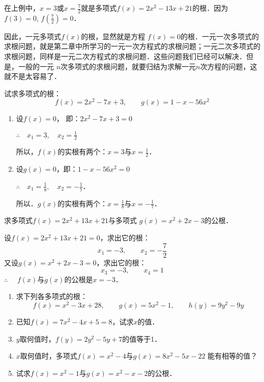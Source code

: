 在上例中，$x=3$或$x=\frac{7}{2}$就是多项式$f(x)=2x^2-13x+21$的根．因为$f(3)=0$, $f\left(\frac{7}{2}\right) =0$．

因此，一元多项式$f(x)$的根，显然就是方程
$f(x)=0$的根．一元一次多项式的求根问题，就是第二章中所学习的一元一次方程式的求根问题；一元二次多项式的求根问题，同样是一元二次方程式的求根问题．这些问题我们已经可以解决．但是，一般的一元
$n$次多项式的求根问题，就要归结为求解一元$n$次方程的问题，这就不是太容易了．

\begin{example}
    试求多项式的根：
\[f (x) =2x^2-7x+3,\qquad g (x) =1-x-56x^2\]
\end{example}

\begin{solution}
  \begin{enumerate}
      \item 设$f(x)=0$，
      即：$2x^2-7x+3=0$

      $\therefore\quad x_1=3,\quad x_2=\frac{1}{2}$

      所以，$f(x)$的实根有两个：$x=3$与$x=\frac{1}{2}$．
      \item 设$g(x)=0$，即：$1-x-56x^2=0$
      
$\therefore\quad x_1=\frac{1}{8},\quad x_2=-\frac{1}{7}$．

所以．$g(x)$的实根有两个：$x=\frac{1}{8}$与$x=-\frac{1}{7}$．
  \end{enumerate}  
\end{solution}

\begin{example}
    求多项式$f(x)=2x^2+13x+21$与多项式
$g(x)=x^2+2x-3$的公根．
\end{example}

\begin{solution}
    设$f(x)=2x^2+13x+21=0$，求出它的根：
\[x_1=-3,\qquad x_2=-\frac{7}{2}\]
又设$g(x)=x^2+2x-3=0$，求出它的根：
\[x_3=-3,\qquad x_4=1\]
$\therefore\quad $ $f(x)$与$g(x)$的公根是$x=-3$．
\end{solution}

\begin{ex}
    \begin{enumerate}
        \item 求下列各多项式的根：
        \[f (x) =x^2-3x+28,\qquad g (x) =5x^2-1,\qquad h (y) =9y^2-9y\]
        \item 已知$f(x)=7x^2-4x+5=8$，试求$x$的值．
        \item $y$取何值时，$f(y)=2y^2-5y+7$的值等于1．
        \item $x$取何值时，多项式$f(x)=x^2-4$与$g(x)=8x^2-5x-22$
能有相等的值？
\item 试求$f(x)=x^2-1$与$g(x)=x^2-x-2$的公根．
    \end{enumerate}
\end{ex}


